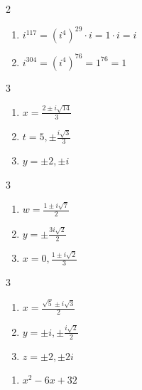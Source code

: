\documentclass{ximera}
\begin{document}
\begin{multicols}{2}
\begin{enumerate}
\setcounter{enumi}{\value{HW}}
\item $i^{117} = \left(i^{4}\right)^{29} \cdot i = 1 \cdot i = i$
\item $i ^{304} = \left(i^{4}\right)^{76} = 1^{76} = 1$

\setcounter{HW}{\value{enumi}}
\end{enumerate}
\end{multicols}

\begin{multicols}{3}
\begin{enumerate}
\setcounter{enumi}{\value{HW}}

\item $x = \frac{2 \pm i\sqrt{14}}{3}$ 
\item  $t = 5, \pm \frac{i \sqrt{3}}{3}$ 
\item  $y = \pm 2, \pm i$

\setcounter{HW}{\value{enumi}}
\end{enumerate}
\end{multicols}
\begin{multicols}{3}
\begin{enumerate}
\setcounter{enumi}{\value{HW}}

\item $w = \frac{1 \pm i \sqrt{7}}{2}$ 
\item $y = \pm \frac{3i \sqrt{2}}{2}$
\item $x= 0, \frac{1 \pm i\sqrt{2}}{3}$ 

\setcounter{HW}{\value{enumi}}
\end{enumerate}
\end{multicols}

\begin{multicols}{3}
\begin{enumerate}
\setcounter{enumi}{\value{HW}}

\item  $x = \frac{\sqrt{5} \pm i\sqrt{3}}{2}$
\item  $y = \pm i, \pm \frac{i\sqrt{2}}{2}$ 
\item  $z = \pm 2, \pm 2i$  
\setcounter{HW}{\value{enumi}}

\end{enumerate}
\end{multicols}


\begin{enumerate}
\setcounter{enumi}{\value{HW}}

\item $x^2 - 6x + 32$

\end{enumerate}
\end{document}
